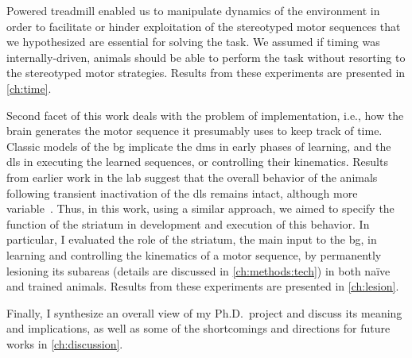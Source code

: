 Powered treadmill enabled us to manipulate dynamics of the environment in order to facilitate or hinder exploitation of the stereotyped motor sequences that we hypothesized are essential for solving the task.
We assumed if timing was internally-driven, animals should be able to perform the task without resorting to the stereotyped motor strategies.
Results from these experiments are presented in \autoref{ch:time}.
\par
Second facet of this work deals with the problem of implementation, i.e., how the brain generates the motor 
sequence it presumably uses to keep track of time.
Classic models of the \gls{bg} implicate the \gls{dms} in early phases of learning, and the \gls{dls} in executing the learned sequences, or controlling their kinematics.
Results from earlier work in the lab suggest that the overall behavior of the animals following transient inactivation of the \gls{dls} remains intact, although more variable~\cite{Rueda2015NN}.
Thus, in this work, using a similar approach, we aimed to specify the function of the striatum in development and execution of this behavior.
In particular, I evaluated the role of the striatum, the main input to the \gls{bg}, in learning and controlling the kinematics of a motor sequence, by permanently lesioning its subareas (details are discussed in \autoref{ch:methods:tech}) in both na\"ive and trained animals.
Results from these experiments are presented in \autoref{ch:lesion}.
\par
Finally, I synthesize an overall view of my Ph.D.\ project and discuss its meaning and implications, as well as some of the shortcomings and directions for future works in \autoref{ch:discussion}.